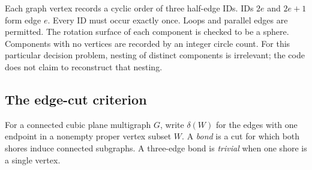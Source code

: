 \documentclass[11pt]{article}
\theoremstyle{remark}\newtheorem{remark}[theorem]{Remark}
\begin{document}
Each graph vertex records a cyclic order of three half-edge IDs. IDs $2e$ and
$2e+1$ form edge $e$. Every ID must occur exactly once. Loops and parallel edges
are permitted. The rotation surface of each component is checked to be a
sphere. Components with no vertices are recorded by an integer circle count.
For this particular decision problem, nesting of distinct components is
irrelevant; the code does not claim to reconstruct that nesting.

\subsection{The edge-cut criterion}
For a connected cubic plane multigraph $G$, write $\delta(W)$ for the edges
with one endpoint in a nonempty proper vertex subset $W$. A \emph{bond} is a
cut for which both shores induce connected subgraphs. A three-edge bond is
\emph{trivial} when one shore is a single vertex.
\end{document}
